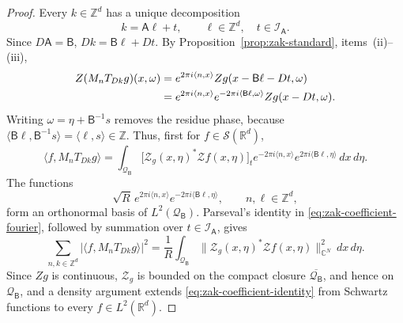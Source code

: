 \documentclass[11pt,reqno]{amsart}
\numberwithin{equation}{section}
\theoremstyle{definition}
\theoremstyle{remark}
\newcommand{\R}{\mathbb R}
\newcommand{\Z}{\mathbb Z}
\newcommand{\C}{\mathbb C}
\newcommand{\Sclass}{\mathcal S}
\newcommand{\ip}[2]{\langle #1,#2\rangle}
\begin{document}
\begin{proof}
Every $k\in\Z^d$ has a unique decomposition
\begin{equation}\label{eq:zak-k-decomposition}
                       k=\mathsf A\ell+t,
 \qquad \ell\in\Z^d,
 \quad t\in\mathcal I_{\mathsf A}.
\end{equation}
Since $D\mathsf A=\mathsf B$,
$Dk=\mathsf B\ell+Dt$.  By
Proposition~\ref{prop:zak-standard}, items~(ii)--(iii),
\begin{align}
 Z(M_nT_{Dk}g)(x,\omega)
 &=e^{2\pi i\ip{n}{x}}
   Zg(x-\mathsf B\ell-Dt,\omega)\notag\\
 &=e^{2\pi i\ip{n}{x}}
   e^{-2\pi i\ip{\mathsf B\ell}{\omega}}
   Zg(x-Dt,\omega).
 \label{eq:zak-atom-transform}
\end{align}
Writing $\omega=\eta+\mathsf B^{-1}s$ removes the residue phase, because
$\ip{\mathsf B\ell}{\mathsf B^{-1}s}=\ip{\ell}{s}\in\Z$.  Thus, first for
$f\in\Sclass(\R^d)$,
\begin{equation}\label{eq:zak-coefficient-fourier}
 \ip{f}{M_nT_{Dk}g}
 =\int_{\mathcal Q_{\mathsf B}}
   \bigl[\mathcal Z_g(x,\eta)^*\mathcal Zf(x,\eta)\bigr]_t
   e^{-2\pi i\ip{n}{x}}
   e^{2\pi i\ip{\mathsf B\ell}{\eta}}
   \,dx\,d\eta.
\end{equation}
The functions
\begin{equation}\label{eq:zak-Q-ONB}
 \sqrt R\,
 e^{2\pi i\ip{n}{x}}
 e^{-2\pi i\ip{\mathsf B\ell}{\eta}},
 \qquad n,\ell\in\Z^d,
\end{equation}
form an orthonormal basis of $L^2(\mathcal Q_{\mathsf B})$.  Parseval's
identity in \eqref{eq:zak-coefficient-fourier}, followed by summation over
$t\in\mathcal I_{\mathsf A}$, gives
\begin{equation}\label{eq:zak-coefficient-identity}
 \sum_{n,k\in\Z^d}
   \bigl|\ip{f}{M_nT_{Dk}g}\bigr|^2
 =\frac1R\int_{\mathcal Q_{\mathsf B}}
      \bigl\|\mathcal Z_g(x,\eta)^*\mathcal Zf(x,\eta)\bigr\|_{\C^N}^2
      \,dx\,d\eta.
\end{equation}
Since $Zg$ is continuous, $\mathcal Z_g$ is bounded on the compact closure $\overline{\mathcal Q_{\mathsf B}}$, and hence on $\mathcal Q_{\mathsf B}$,
and a density argument extends \eqref{eq:zak-coefficient-identity} from
Schwartz functions to every $f\in L^2(\R^d)$.


\end{proof}
\end{document}
